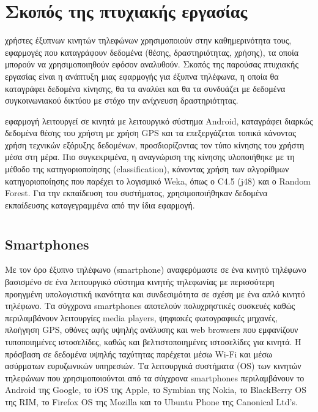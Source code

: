 \documentclass[12pt,twoside,openright]{report}
\begin{document}
\section[Σκοπός της πτυχιακής εργασίας]{Σκοπός της πτυχιακής εργασίας}
 χρήστες έξυπνων κινητών τηλεφώνων χρησιμοποιούν στην καθημερινότητα τους, εφαρμογές που καταγράφουν δεδομένα (θέσης, δραστηριότητας, χρήσης), τα οποία μπορούν να χρησιμοποιηθούν εφόσον αναλυθούν. Σκοπός της παρούσας πτυχιακής εργασίας είναι η ανάπτυξη μιας εφαρμογής για έξυπνα τηλέφωνα, η οποία θα καταγράφει δεδομένα κίνησης, θα τα αναλύει και θα τα συνδυάζει με δεδομένα συγκοινωνιακού δικτύου με στόχο την ανίχνευση δραστηριότητας. 

 εφαρμογή λειτουργεί σε κινητά με λειτουργικό σύστημα \lt Android,  \gt καταγράφει διαρκώς δεδομένα θέσης του χρήστη με χρήση \lt GPS \gt και τα επεξεργάζεται τοπικά κάνοντας χρήση τεχνικών εξόρυξης δεδομένων, προσδιορίζοντας τον τύπο κίνησης του χρήστη μέσα στη μέρα. Πιο συγκεκριμένα, η αναγνώριση της κίνησης υλοποιήθηκε με τη μέθοδο της κατηγοριοποίησης \lt(classification), \gt κάνοντας χρήση των αλγορίθμων κατηγοριοποίησης που παρέχει το λογισμικό \lt Weka, \gt όπως  ο \lt C4.5 (j48) \gt και ο \lt Random Forest. \gt Για την εκπαίδευση του συστήματος, χρησιμοποιήθηκαν δεδομένα εκπαίδευσης καταγεγραμμένα από την ίδια εφαρμογή.

\section[\lt{Smartphones} \gt{και Λειτουργικό Σύστημα} \lt{Android}]{  }

\subsection{\lt Smartphones\gt}
Με τον όρο έξυπνο τηλέφωνο \lt (smartphone) \gt αναφερόμαστε σε ένα κινητό τηλέφωνο βασισμένο σε ένα λειτουργικό σύστημα κινητής τηλεφωνίας με περισσότερη προηγμένη υπολογιστική ικανότητα και συνδεσιμότητα σε σχέση με ένα απλό κινητό τηλέφωνο.  Τα σύγχρονα \lt smartphones \gt αποτελούν πολυχρηστικές συσκευές καθώς περιλαμβάνουν λειτουργίες \lt media players, \gt ψηφιακές φωτογραφικές μηχανές, πλοήγηση \lt GPS, \gt οθόνες αφής υψηλής ανάλυσης και \lt web browsers \gt που εμφανίζουν τυποποιημένες ιστοσελίδες, καθώς και βελτιστοποιημένες ιστοσελίδες για κινητά. Η πρόσβαση σε δεδομένα υψηλής ταχύτητας παρέχεται μέσω \lt Wi-Fi \gt και μέσω ασύρματων ευρυζωνικών υπηρεσιών. Τα λειτουργικά συστήματα \lt (OS) \gt των κινητών τηλεφώνων που χρησιμοποιούνται από τα σύγχρονα smartphones περιλαμβάνουν το \lt Android \gt της \lt Google, \gt το \lt iOS \gt της \lt Apple, \gt το \lt Symbian \gt της \lt Nokia, \gt το \lt BlackBerry OS \gt της \lt RIM, \gt το \lt Firefox OS \gt της \lt Mozilla \gt και το \lt Ubuntu Phone \gt της \lt Canonical Ltd's\gt.\cite{smartphone}
\end{document}
